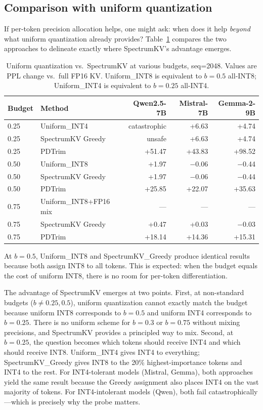 \documentclass[11pt]{article}
\newcommand{\method}{SpectrumKV}
\newcommand{\budget}{b}
\newcommand{\pct}{\%}
\theoremstyle{plain}
\theoremstyle{definition}
\begin{document}
\subsection{Comparison with uniform quantization}
\label{sec:uniform-comparison}

If per-token precision allocation helps, one might ask: when does it help \emph{beyond} what uniform quantization already provides?  Table~\ref{tab:uniform} compares the two approaches to delineate exactly where \method{}'s advantage emerges.

\begin{table}[t]
\centering
\caption{Uniform quantization vs.\ \method{} at various budgets, seq=2048.  Values are PPL change vs.\ full FP16 KV.  Uniform\_INT8 is equivalent to $\budget=0.5$ all-INT8; Uniform\_INT4 is equivalent to $\budget=0.25$ all-INT4.}
\label{tab:uniform}
\small
\begin{tabular}{llrrr}
\toprule
Budget & Method & Qwen2.5-7B & Mistral-7B & Gemma-2-9B \\
\midrule
0.25 & Uniform\_INT4 & catastrophic & +6.63 & +4.74 \\
0.25 & \method{} Greedy & unsafe & +6.63 & +4.74 \\
0.25 & PDTrim & +51.47 & +43.83 & +98.52 \\
\midrule
0.50 & Uniform\_INT8 & +1.97 & $-$0.06 & $-$0.44 \\
0.50 & \method{} Greedy & +1.97 & $-$0.06 & $-$0.44 \\
0.50 & PDTrim & +25.85 & +22.07 & +35.63 \\
\midrule
0.75 & Uniform\_INT8+FP16 mix & --- & --- & --- \\
0.75 & \method{} Greedy & +0.47 & +0.03 & $-$0.03 \\
0.75 & PDTrim & +18.14 & +14.36 & +15.31 \\
\bottomrule
\end{tabular}
\end{table}

At $\budget=0.5$, Uniform\_INT8 and \method{}\_Greedy produce identical results because both assign INT8 to all tokens.  This is expected: when the budget equals the cost of uniform INT8, there is no room for per-token differentiation.

The advantage of \method{} emerges at two points.  First, at non-standard budgets ($\budget \ne 0.25, 0.5$), uniform quantization cannot exactly match the budget because uniform INT8 corresponds to $\budget=0.5$ and uniform INT4 corresponds to $\budget=0.25$.  There is no uniform scheme for $\budget=0.3$ or $\budget=0.75$ without mixing precisions, and \method{} provides a principled way to mix.  Second, at $\budget=0.25$, the question becomes which tokens should receive INT4 and which should receive INT8.  Uniform\_INT4 gives INT4 to everything; \method{}\_Greedy gives INT8 to the 20\pct{} highest-importance tokens and INT4 to the rest.  For INT4-tolerant models (Mistral, Gemma), both approaches yield the same result because the Greedy assignment also places INT4 on the vast majority of tokens.  For INT4-intolerant models (Qwen), both fail catastrophically---which is precisely why the probe matters.
\end{document}
